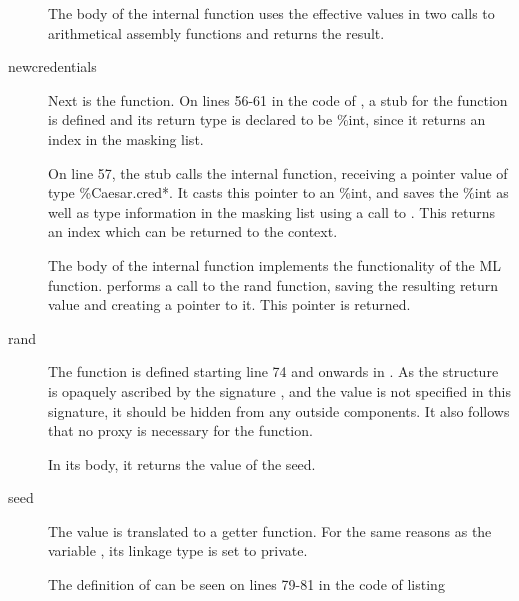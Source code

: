 \begin{description}
The body of the internal function uses the effective values in two calls to arithmetical assembly functions and returns the result.

\item[newcredentials] Next is the  function.
On lines 56-61 in the code of , a stub for the function is defined and its return type is declared to be \%int, since it returns an index in the masking list.

On line 57, the stub calls the internal function, receiving a pointer value of type \%Caesar.cred*.
It casts this pointer to an \%int, and saves the \%int as well as type information in the masking list using a call to .
This returns an index which can be returned to the context.


The body of the internal function  implements the functionality of the ML  function.
 performs a call to the rand function, saving the resulting return value and creating a pointer to it.
This pointer is returned.

\item[rand] The function  is defined starting line 74 and onwards in .
As the structure  is opaquely ascribed by the signature , and the value  is not specified in this signature, it should be hidden from any outside components. 
It also follows that no proxy is necessary for the  function.

In its body, it returns the value of the seed.

\item[seed] The value  is translated to a getter function.
For the same reasons as the variable , its linkage type is set to private. 

The definition of  can be seen on lines 79-81 in the code of listing~
\end{description}

